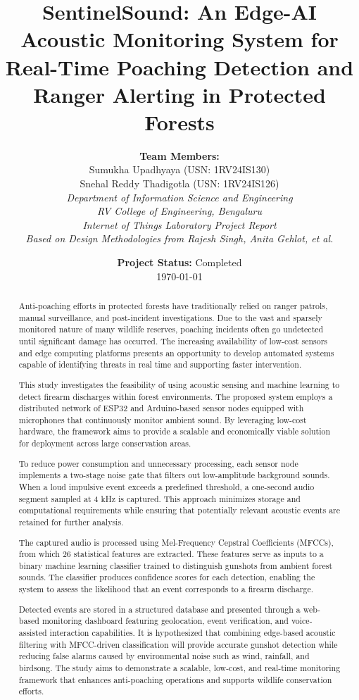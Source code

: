 \documentclass[11pt,a4paper]{article}
\title{\textbf{SentinelSound: An Edge-AI Acoustic Monitoring System for Real-Time Poaching Detection and Ranger Alerting in Protected Forests}}
\author{
    \textbf{Team Members:} \\
    Sumukha Upadhyaya (USN: 1RV24IS130) \\
    Snehal Reddy Thadigotla (USN: 1RV24IS126) \\[0.3cm]
    \textit{Department of Information Science and Engineering} \\
    \textit{RV College of Engineering, Bengaluru} \\[0.5cm]
    \textit{Internet of Things Laboratory Project Report} \\
    \textit{Based on Design Methodologies from Rajesh Singh, Anita Gehlot, et al.}
}
\date{\textbf{Project Status:} Completed \\ \today}
\begin{document}
\maketitle

\begin{abstract}
Anti-poaching efforts in protected forests have traditionally relied on ranger patrols, manual surveillance, and post-incident investigations. Due to the vast and sparsely monitored nature of many wildlife reserves, poaching incidents often go undetected until significant damage has occurred. The increasing availability of low-cost sensors and edge computing platforms presents an opportunity to develop automated systems capable of identifying threats in real time and supporting faster intervention.

This study investigates the feasibility of using acoustic sensing and machine learning to detect firearm discharges within forest environments. The proposed system employs a distributed network of ESP32 and Arduino-based sensor nodes equipped with microphones that continuously monitor ambient sound. By leveraging low-cost hardware, the framework aims to provide a scalable and economically viable solution for deployment across large conservation areas.

To reduce power consumption and unnecessary processing, each sensor node implements a two-stage noise gate that filters out low-amplitude background sounds. When a loud impulsive event exceeds a predefined threshold, a one-second audio segment sampled at 4 kHz is captured. This approach minimizes storage and computational requirements while ensuring that potentially relevant acoustic events are retained for further analysis.

The captured audio is processed using Mel-Frequency Cepstral Coefficients (MFCCs), from which 26 statistical features are extracted. These features serve as inputs to a binary machine learning classifier trained to distinguish gunshots from ambient forest sounds. The classifier produces confidence scores for each detection, enabling the system to assess the likelihood that an event corresponds to a firearm discharge.

Detected events are stored in a structured database and presented through a web-based monitoring dashboard featuring geolocation, event verification, and voice-assisted interaction capabilities. It is hypothesized that combining edge-based acoustic filtering with MFCC-driven classification will provide accurate gunshot detection while reducing false alarms caused by environmental noise such as wind, rainfall, and birdsong. The study aims to demonstrate a scalable, low-cost, and real-time monitoring framework that enhances anti-poaching operations and supports wildlife conservation efforts.
\end{abstract}
\end{document}
